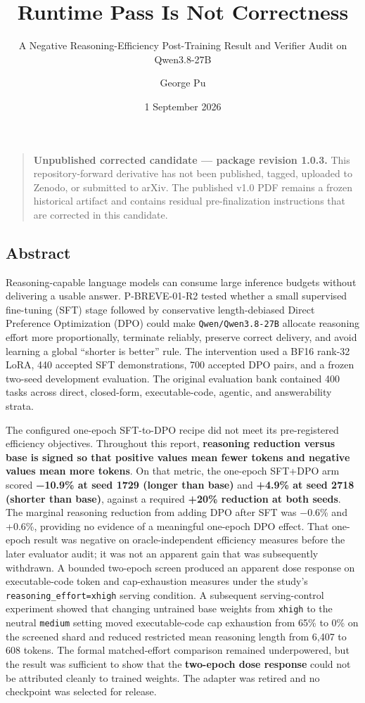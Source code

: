 \documentclass[
]{article}
\title{Runtime Pass Is Not Correctness}
\subtitle{A Negative Reasoning-Efficiency Post-Training Result and
Verifier Audit on Qwen3.8-27B}
\author{George Pu}
\date{1 September 2026}
\begin{document}
\maketitle

{
\setcounter{tocdepth}{3}
\tableofcontents
}
\begin{quote}
\textbf{Unpublished corrected candidate --- package revision 1.0.3.}
This repository-forward derivative has not been published, tagged,
uploaded to Zenodo, or submitted to arXiv. The published v1.0 PDF
remains a frozen historical artifact and contains residual
pre-finalization instructions that are corrected in this candidate.
\end{quote}

\subsection{Abstract}\label{abstract}

Reasoning-capable language models can consume large inference budgets
without delivering a usable answer. P-BREVE-01-R2 tested whether a small
supervised fine-tuning (SFT) stage followed by conservative
length-debiased Direct Preference Optimization (DPO) could make
\texttt{Qwen/Qwen3.8-27B} allocate reasoning effort more proportionally,
terminate reliably, preserve correct delivery, and avoid learning a
global ``shorter is better'' rule. The intervention used a BF16 rank-32
LoRA, 440 accepted SFT demonstrations, 700 accepted DPO pairs, and a
frozen two-seed development evaluation. The original evaluation bank
contained 400 tasks across direct, closed-form, executable-code,
agentic, and answerability strata.

The configured one-epoch SFT-to-DPO recipe did not meet its
pre-registered efficiency objectives. Throughout this report,
\textbf{reasoning reduction versus base is signed so that positive
values mean fewer tokens and negative values mean more tokens}. On that
metric, the one-epoch SFT+DPO arm scored \textbf{−10.9\% at seed 1729
(longer than base)} and \textbf{+4.9\% at seed 2718 (shorter than
base)}, against a required \textbf{+20\% reduction at both seeds}. The
marginal reasoning reduction from adding DPO after SFT was −0.6\% and
+0.6\%, providing no evidence of a meaningful one-epoch DPO effect. That
one-epoch result was negative on oracle-independent efficiency measures
before the later evaluator audit; it was not an apparent gain that was
subsequently withdrawn. A bounded two-epoch screen produced an apparent
dose response on executable-code token and cap-exhaustion measures under
the study's \texttt{reasoning\_effort=xhigh} serving condition. A
subsequent serving-control experiment showed that changing untrained
base weights from \texttt{xhigh} to the neutral \texttt{medium} setting
moved executable-code cap exhaustion from 65\% to 0\% on the screened
shard and reduced restricted mean reasoning length from 6,407 to 608
tokens. The formal matched-effort comparison remained underpowered, but
the result was sufficient to show that the \textbf{two-epoch dose
response} could not be attributed cleanly to trained weights. The
adapter was retired and no checkpoint was selected for release.
\end{document}
